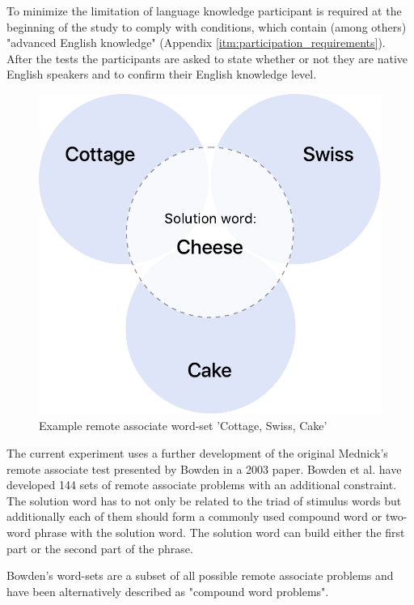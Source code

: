 		To minimize the limitation of language knowledge participant is required at the beginning of the study to comply with conditions, which contain (among others) "advanced English knowledge" (Appendix \ref{itm:participation_requirements}). After the tests the participants are asked to state whether or not they are native English speakers and to confirm their English knowledge level.
		
		\begin{figure}[h]
			\centering
			\includegraphics[height=0.3\textheight]{graphics/Example-RAT-Set}
			\caption{Example remote associate word-set 'Cottage, Swiss, Cake'}
			\label{fig:exampleratset}
		\end{figure}

		The current experiment uses a further development of the original Mednick's remote associate test presented by Bowden in a 2003 paper. Bowden et al. \cite{Bowden} have developed 144 sets of remote associate problems with an additional constraint. The solution word has to not only be related to the triad of stimulus words but additionally each of them should form a commonly used compound word or two-word phrase with the solution word. The solution word can build either the first part or the second part of the phrase.
		
		Bowden's word-sets are a subset of all possible remote associate problems and have been alternatively described as "compound word problems".
		
